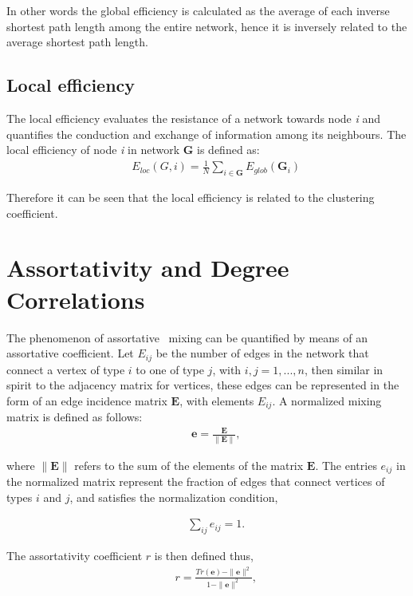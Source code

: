 In other words the global efficiency is calculated as the average of each inverse shortest path length among the entire network, hence it is inversely related to the average shortest path length.

\subsection{Local efficiency}
The local efficiency evaluates the resistance of a network towards node \textit{i} and quantifies the conduction and exchange of information among its neighbours. The local efficiency of node \textit{i} in network \textbf{G} is defined as:
\begin{eqnarray}
&&E_{loc}(G, i)=\frac{1}{N} \sum_{i \in \textbf{G}} E_{glob}(\textbf{G}_i)
\end{eqnarray}

Therefore it can be seen that the local efficiency is related to the clustering coefficient.

\section{Assortativity and Degree Correlations}

The phenomenon of assortative~\cite{newman2002assortative} mixing can be quantified by means of an assortative
coefficient. Let $E_{ij}$ be the number of edges in the network that connect
a vertex of type $i$ to one of type $j$, with $i, j=1, . . . , n$, then similar in spirit to the
adjacency matrix for vertices, these edges can be represented in the form of an edge
incidence matrix $\mathbf{E}$, with elements $E_{ij}$. A normalized mixing matrix is defined as follows:
\begin{eqnarray}
&&\mathbf{e}=\frac{\mathbf{E}}{\|\mathbf{E}\|},
\end{eqnarray}

where $\|\mathbf{E}\|$ refers to the sum of the elements of the matrix $\mathbf{E}$. The entries $e_{ij}$ in the normalized matrix represent the fraction of edges that connect vertices of types $i$ and $j$, and satisfies the normalization condition,

\begin{eqnarray}
&&\sum_{ij}e_{ij}=1.
\end{eqnarray}

The assortativity coefficient $r$ is then defined thus,
\begin{eqnarray}
&&r=\frac{Tr(\mathbf{e})-\|\mathbf{e}\|^2}{1-\|\mathbf{e}\|^2},\label{con:degreecorr}
\end{eqnarray}

